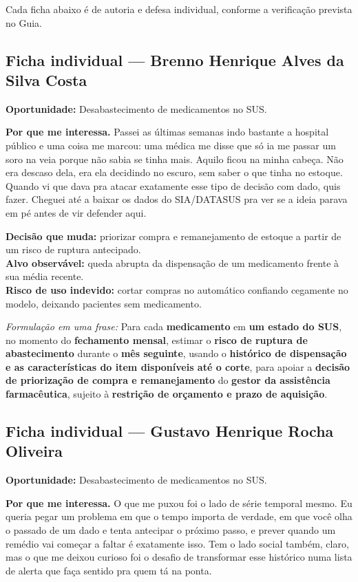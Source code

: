 \documentclass[11pt,a4paper]{article}
\begin{document}
Cada ficha abaixo é de autoria e defesa individual, conforme a verificação prevista no Guia.

\subsection*{Ficha individual --- Brenno Henrique Alves da Silva Costa}
\textbf{Oportunidade:} Desabastecimento de medicamentos no SUS.

\textbf{Por que me interessa.} Passei as últimas semanas indo bastante a hospital público e uma coisa me marcou: uma médica me disse que só ia me passar um soro na veia porque não sabia se tinha mais. Aquilo ficou na minha cabeça. Não era descaso dela, era ela decidindo no escuro, sem saber o que tinha no estoque. Quando vi que dava pra atacar exatamente esse tipo de decisão com dado, quis fazer. Cheguei até a baixar os dados do SIA/DATASUS pra ver se a ideia parava em pé antes de vir defender aqui.

\textbf{Decisão que muda:} priorizar compra e remanejamento de estoque a partir de um risco de ruptura antecipado.\\
\textbf{Alvo observável:} queda abrupta da dispensação de um medicamento frente à sua média recente.\\
\textbf{Risco de uso indevido:} cortar compras no automático confiando cegamente no modelo, deixando pacientes sem medicamento.

\textit{Formulação em uma frase:} Para cada \textbf{medicamento} em \textbf{um estado do SUS}, no momento do \textbf{fechamento mensal}, estimar o \textbf{risco de ruptura de abastecimento} durante o \textbf{mês seguinte}, usando o \textbf{histórico de dispensação e as características do item disponíveis até o corte}, para apoiar a \textbf{decisão de priorização de compra e remanejamento} do \textbf{gestor da assistência farmacêutica}, sujeito à \textbf{restrição de orçamento e prazo de aquisição}.

\vspace{6pt}
\subsection*{Ficha individual --- Gustavo Henrique Rocha Oliveira}
\textbf{Oportunidade:} Desabastecimento de medicamentos no SUS.

\textbf{Por que me interessa.} O que me puxou foi o lado de série temporal mesmo. Eu queria pegar um problema em que o tempo importa de verdade, em que você olha o passado de um dado e tenta antecipar o próximo passo, e prever quando um remédio vai começar a faltar é exatamente isso. Tem o lado social também, claro, mas o que me deixou curioso foi o desafio de transformar esse histórico numa lista de alerta que faça sentido pra quem tá na ponta.
\end{document}
